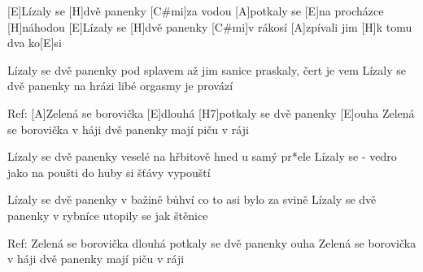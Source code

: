 
[E]Lízaly se [H]dvě panenky [C#mi]za vodou 
[A]potkaly se [E]na procházce [H]náhodou 
[E]Lízaly se [H]dvě panenky [C#mi]v rákosí 
[A]zpívali jim [H]k tomu dva ko[E]si 

Lízaly se dvě panenky pod splavem 
až jim sanice praskaly, čert je vem 
Lízaly se dvě panenky na hrázi 
libé orgasmy je provází 

Ref:
[A]Zelená se borovička [E]dlouhá 
[H7]potkaly se dvě panenky [E]ouha 
Zelená se borovička v háji 
dvě panenky mají piču v ráji


Lízaly se dvě panenky veselé 
na hřbitově hned u samý pr*ele 
Lízaly se - vedro jako na poušti 
do huby si šťávy vypouští 

Lízaly se dvě panenky v bažině 
bůhví co to asi bylo za svině 
Lízaly se dvě panenky v rybníce 
utopily se jak štěnice 

Ref: 
Zelená se borovička dlouhá 
potkaly se dvě panenky ouha 
Zelená se borovička v háji 
dvě panenky mají piču v ráji